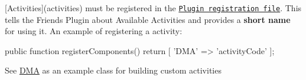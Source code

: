 \mbox{[}Activities\mbox{]}(activities) must be registered in the \href{#registration-file}{\tt Plugin registration file}. This tells the Friends Plugin about Available Activities and provides a {\bfseries short name} for using it. An example of registering a activity\+: \begin{DoxyVerb}public function registerComponents()
{
    return [
        'DMA\Friends\Activities\ActivityCode' => 'activityCode'
    ];
}
\end{DoxyVerb}


See \hyperlink{namespaceDMA}{D\+M\+A} as an example class for building custom activities 